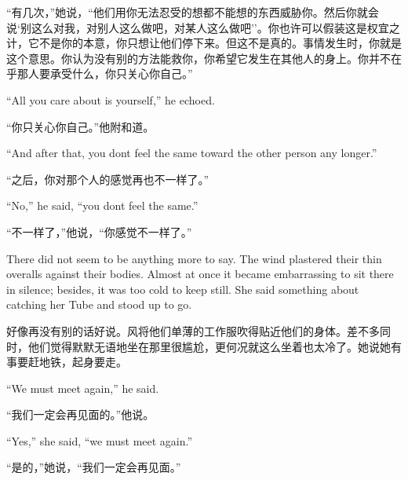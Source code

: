 \begin{paracol}{2}
\switchcolumn

``有几次，''她说，``他们用你无法忍受的想都不能想的东西威胁你。然后你就会说`别这么对我，对别人这么做吧，对某人这么做吧''。你也许可以假装这是权宜之计，它不是你的本意，你只想让他们停下来。但这不是真的。事情发生时，你就是这个意思。你认为没有别的方法能救你，你希望它发生在其他人的身上。你并不在乎那人要承受什么，你只关心你自己。''

\switchcolumn*

``All you care about is yourself,'' he echoed.

\switchcolumn

``你只关心你自己。''他附和道。

\switchcolumn*

``And after that, you don\textquotesingle t feel the same toward the
other person any longer.''

\switchcolumn

``之后，你对那个人的感觉再也不一样了。''

\switchcolumn*

``No,'' he said, ``you don\textquotesingle t feel the same.''

\switchcolumn

``不一样了，''他说，``你感觉不一样了。''

\switchcolumn*

There did not seem to be anything more to say. The wind plastered their
thin overalls against their bodies. Almost at once it became
embarrassing to sit there in silence; besides, it was too cold to keep
still. She said something about catching her Tube and stood up to go.

\switchcolumn

好像再没有别的话好说。风将他们单薄的工作服吹得贴近他们的身体。差不多同时，他们觉得默默无语地坐在那里很尴尬，更何况就这么坐着也太冷了。她说她有事要赶地铁，起身要走。

\switchcolumn*

``We must meet again,'' he said.

\switchcolumn

``我们一定会再见面的。''他说。

\switchcolumn*

``Yes,'' she said, ``we must meet again.''

\switchcolumn

``是的，''她说，``我们一定会再见面。''

\switchcolumn*


\end{paracol}
